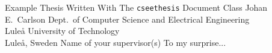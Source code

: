 \documentclass[12pt,a4paper,openright,final,twoside]{cseethesis}
\begin{document}
\def\thesistitle{Example Thesis Written With The \texttt{cseethesis} Document Class}
\def\theauthor{Johan E.\ Carlson}
\def\theaddress{Dept.\ of Computer Science and Electrical Engineering\\
Lule{\aa} University of Technology\\ Lule{\aa}, Sweden}

\def\supervisors{Name of your supervisor(s)}
\def\supervisorstring{Supervisors:} %
\def\dedication{To my surprise...}

\def\theabstract{}
\def\thepreface{}



\def\thelogo{} %


\startpreamble
  {\thesistitle}
  {\theauthor}
  {\theaddress}
  {\supervisors}
  {\dedication}
  {\theabstract}
  {\thepreface}
  {\thelogo}

\end{document}
